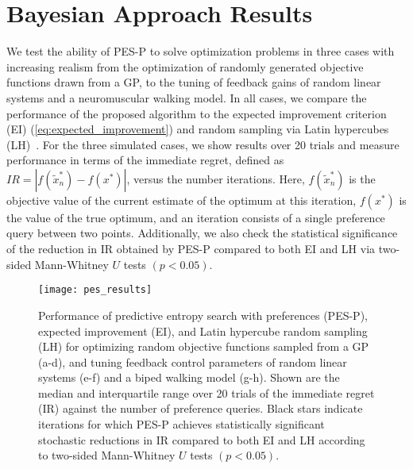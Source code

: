 \section{Bayesian Approach Results}\label{s:results}
We test the ability of PES-P to solve optimization problems in three cases with
increasing realism from the optimization of randomly generated objective
functions drawn from a GP, to the tuning of feedback gains of random linear
systems and a neuromuscular walking model. In all cases, we compare the
performance of the proposed algorithm to the expected improvement criterion (EI)
(\cref{eq:expected_improvement}) and random sampling via Latin hypercubes
(LH)~\citep{mckay2000comparison}. For the three simulated cases, we show
results over 20 trials and measure performance in terms of the immediate regret,
defined as $IR = |f(\tilde x_n^*) - f(x^*)|$, versus the number iterations.
Here, $f(\tilde x_n^*)$ is the objective value of the current estimate of the
optimum at this iteration, $f(x^*)$ is the value of the true optimum, and an
iteration consists of a single preference query between two points.
Additionally, we also check the statistical significance of the reduction in IR
obtained by PES-P compared to both EI and LH via two-sided Mann-Whitney $U$
tests $(p < 0.05)$.

\begin{figure*}[t!]
    \centering
    \texttt{[image: pes\_results]}
    \caption[Comparison of Preference-based Bayesian optimization
    methods]{Performance of predictive entropy search with preferences (PES-P),
    expected improvement (EI), and Latin hypercube random sampling (LH) for
    optimizing random objective functions sampled from a GP (a-d), and tuning
    feedback control parameters of random linear systems (e-f) and a biped
    walking model (g-h). Shown are the median and interquartile range over 20
    trials of the immediate regret (IR) against the number of preference
    queries. Black stars indicate iterations for which PES-P achieves
    statistically significant stochastic reductions in IR compared to both EI
    and LH according to two-sided Mann-Whitney $U$ tests $(p <
    0.05)$.}\label{fig:y_err_sim}
\end{figure*}

